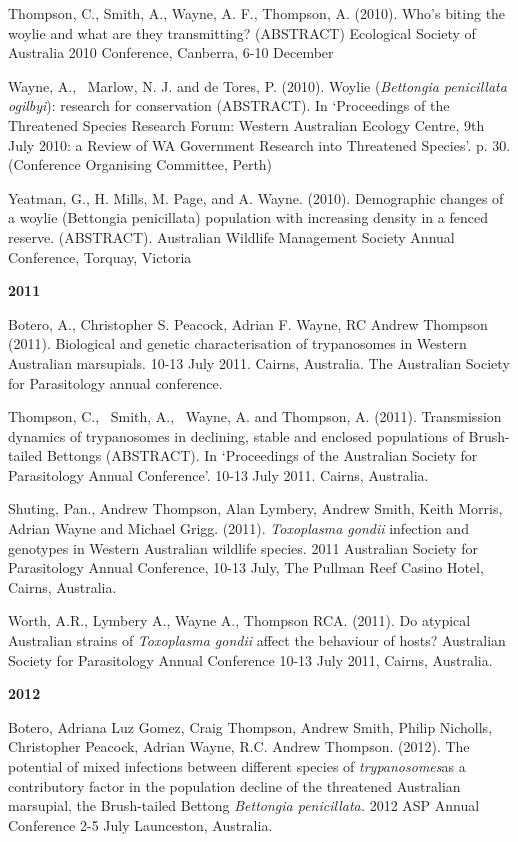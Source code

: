 \documentclass[version=last,
    paper=a4,                               %
    10pt,                                   %
    dvipsnames,
    oneside,                              %
    headings=openany,                       %
    open=any,
    BCOR=7mm,                               %
    DIV=15,     %
]{scrbook}
\begin{document}
Thompson, C., Smith, A., Wayne, A. F., Thompson, A. (2010). Who's biting
the woylie and what are they transmitting? (ABSTRACT) Ecological Society
of Australia 2010 Conference, Canberra, 6-10 December

Wayne, A.,~ Marlow, N. J. and de Tores, P. (2010). Woylie
(\emph{Bettongia penicillata ogilbyi}): research for conservation
(ABSTRACT). In `Proceedings of the Threatened Species Research Forum:
Western Australian Ecology Centre, 9th July 2010: a Review of WA
Government Research into Threatened Species'. p. 30. (Conference
Organising Committee, Perth)

Yeatman, G., H. Mills, M. Page, and A. Wayne. (2010). Demographic
changes of a woylie (Bettongia penicillata) population with increasing
density in a fenced reserve. (ABSTRACT). Australian Wildlife Management
Society Annual Conference, Torquay, Victoria

\textbf{2011}

Botero, A., Christopher S. Peacock, Adrian F. Wayne, RC Andrew Thompson
(2011). Biological and genetic characterisation of trypanosomes in
Western Australian marsupials. 10-13 July 2011. Cairns, Australia. The
Australian Society for Parasitology annual conference.

Thompson, C.,~ Smith, A.,~ Wayne, A. and Thompson, A. (2011).
Transmission dynamics of trypanosomes in declining, stable and enclosed
populations of Brush-tailed Bettongs (ABSTRACT). In `Proceedings of the
Australian Society for Parasitology Annual Conference'. 10-13 July 2011.
Cairns, Australia.

Shuting, Pan., Andrew Thompson, Alan Lymbery, Andrew Smith, Keith
Morris, Adrian Wayne and Michael Grigg. (2011). \emph{Toxoplasma gondii}
infection and genotypes in Western Australian wildlife species. 2011
Australian Society for Parasitology Annual Conference, 10-13 July, The
Pullman Reef Casino Hotel, Cairns, Australia.

Worth, A.R., Lymbery A., Wayne A., Thompson RCA. (2011). Do atypical
Australian strains of \emph{Toxoplasma gondii} affect the behaviour of
hosts? Australian Society for Parasitology Annual Conference 10-13 July
2011, Cairns, Australia.

\textbf{2012}

Botero, Adriana Luz Gomez, Craig Thompson, Andrew Smith, Philip
Nicholls, Christopher Peacock, Adrian Wayne, R.C. Andrew Thompson.
(2012). The potential of mixed infections between different species of
\emph{trypanosomes}as a contributory factor in the population decline of
the threatened Australian marsupial, the Brush-tailed Bettong
\emph{Bettongia penicillata.} 2012 ASP Annual Conference 2-5 July
Launceston, Australia.
\end{document}
